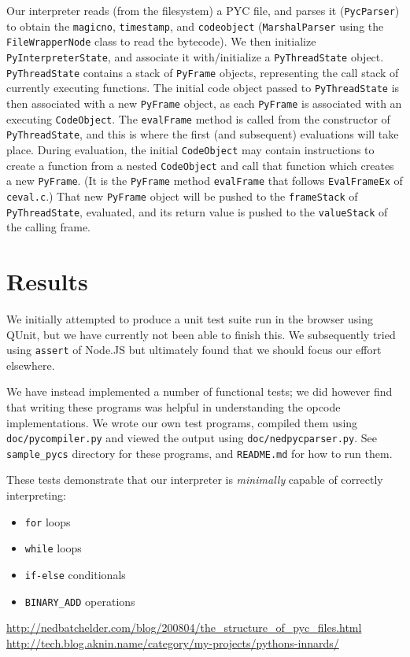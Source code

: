 \documentclass{article}
\begin{document}
Our interpreter reads (from the filesystem) a PYC file, and parses it (\texttt{PycParser}) to obtain the \texttt{magicno}, \texttt{timestamp}, and \texttt{codeobject} (\texttt{MarshalParser} using the \texttt{FileWrapperNode} class to read the bytecode). We then initialize \texttt{PyInterpreterState}, and associate it with/initialize a \texttt{PyThreadState} object. \texttt{PyThreadState}
contains a stack of \texttt{PyFrame} objects, representing the call stack of currently executing functions. The initial code object passed to \texttt{PyThreadState} is then associated with a new \texttt{PyFrame} object, as each \texttt{PyFrame} is associated with an executing \texttt{CodeObject}. The \texttt{evalFrame} method is called from the constructor of \texttt{PyThreadState}, and this is where the first (and subsequent) evaluations will take place.
During evaluation, the initial \texttt{CodeObject} may contain instructions to create a function from a nested \texttt{CodeObject} and call that function which creates a new \texttt{PyFrame}. 
(It is the \texttt{PyFrame} method \texttt{evalFrame} that follows \texttt{EvalFrameEx} of \texttt{ceval.c}.)
That new \texttt{PyFrame} object will be pushed to the \texttt{frameStack} of \texttt{PyThreadState}, evaluated, and its return value is pushed to the \texttt{valueStack} of the calling frame.

\section*{Results}

We initially attempted to produce a unit test suite run in the browser using QUnit, but we have currently not been able to finish this. We subsequently tried using \texttt{assert} of Node.JS but ultimately found that we should focus our effort elsewhere.

We have instead implemented a number of functional tests; we did however find that writing these programs was helpful in understanding the opcode implementations. We wrote our own test programs, compiled them using \texttt{doc/pycompiler.py} and viewed the output using \texttt{doc/nedpycparser.py}. See \texttt{sample\_pycs} directory for these programs, and \texttt{README.md} for how to run them.

These tests demonstrate that our interpreter is \textit{minimally} capable of correctly interpreting:
\begin{itemize}
\item \texttt{for} loops
\item \texttt{while} loops
\item \texttt{if-else} conditionals
\item \texttt{BINARY\_ADD} operations
\end{itemize}

\vspace{0.5cm}
\begin{footnotesize}
\begin{thebibliography}{}

\url{http://nedbatchelder.com/blog/200804/the_structure_of_pyc_files.html}
\url{http://tech.blog.aknin.name/category/my-projects/pythons-innards/}
\end{thebibliography}
\end{footnotesize}
\end{document}

